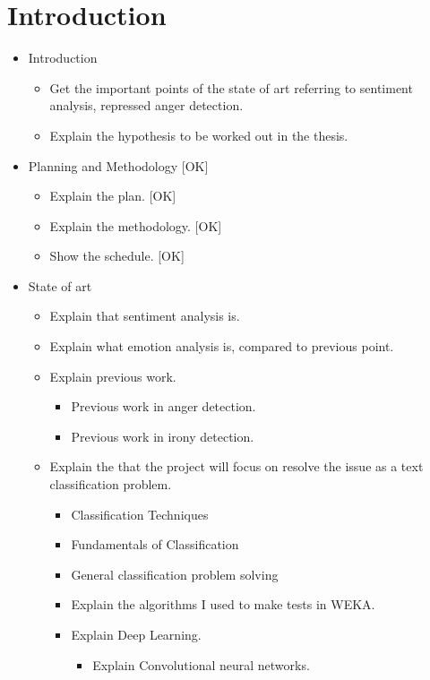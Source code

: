 \chapter{Introduction}

\begin{itemize}
  \item Introduction
  \begin{itemize}
    \item Get the important points of the state of art referring to sentiment analysis, repressed anger detection.
    \item Explain the hypothesis to be worked out in the thesis.
  \end{itemize}

  \item Planning and Methodology [OK]
  \begin{itemize}
    \item Explain the plan. [OK]
    \item Explain the methodology. [OK]
    \item Show the schedule. [OK]
  \end{itemize}

  \item State of art
  \begin{itemize}
    \item Explain that sentiment analysis is.
    \item Explain what emotion analysis is, compared to previous point.
    \item Explain previous work.
    \begin{itemize}
      \item Previous work in anger detection.
      \item Previous work in irony detection.
    \end{itemize}
    \item Explain the that the project will focus on resolve the issue as a text classification problem.
    \begin{itemize}
      \item Classification Techniques 
      \item Fundamentals of Classification 
      \item General classification problem solving
      \item Explain the algorithms I used to make tests in WEKA.
      \item Explain Deep Learning.
      \begin{itemize}
        \item Explain Convolutional neural networks.
      \end{itemize}
    \end{itemize}
  \end{itemize} 


\end{itemize}
